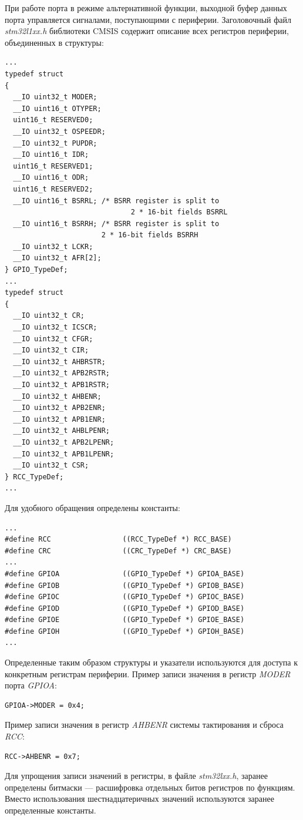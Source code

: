 При работе порта в режиме альтернативной функции, выходной буфер данных порта управляется сигналами, поступающими с периферии. Заголовочный файл \textit{stm32l1xx.h} библиотеки CMSIS содержит описание всех регистров периферии, объединенных в структуры:
\begin{verbatim}
...
typedef struct
{
  __IO uint32_t MODER;
  __IO uint16_t OTYPER;
  uint16_t RESERVED0;
  __IO uint32_t OSPEEDR;
  __IO uint32_t PUPDR;
  __IO uint16_t IDR;
  uint16_t RESERVED1;
  __IO uint16_t ODR;
  uint16_t RESERVED2;
  __IO uint16_t BSRRL; /* BSRR register is split to 
                    		  2 * 16-bit fields BSRRL 
  __IO uint16_t BSRRH; /* BSRR register is split to 
                       2 * 16-bit fields BSRRH 
  __IO uint32_t LCKR;
  __IO uint32_t AFR[2];
} GPIO_TypeDef;
...
typedef struct
{
  __IO uint32_t CR;
  __IO uint32_t ICSCR;
  __IO uint32_t CFGR;
  __IO uint32_t CIR;
  __IO uint32_t AHBRSTR;
  __IO uint32_t APB2RSTR;
  __IO uint32_t APB1RSTR;
  __IO uint32_t AHBENR;
  __IO uint32_t APB2ENR;
  __IO uint32_t APB1ENR;
  __IO uint32_t AHBLPENR;
  __IO uint32_t APB2LPENR;
  __IO uint32_t APB1LPENR;      
  __IO uint32_t CSR;    
} RCC_TypeDef;
...
\end{verbatim}
Для удобного обращения определены константы:
\begin{verbatim}
...
#define RCC                 ((RCC_TypeDef *) RCC_BASE)
#define CRC                 ((CRC_TypeDef *) CRC_BASE)
...
#define GPIOA               ((GPIO_TypeDef *) GPIOA_BASE)
#define GPIOB               ((GPIO_TypeDef *) GPIOB_BASE)
#define GPIOC               ((GPIO_TypeDef *) GPIOC_BASE)
#define GPIOD               ((GPIO_TypeDef *) GPIOD_BASE)
#define GPIOE               ((GPIO_TypeDef *) GPIOE_BASE)
#define GPIOH               ((GPIO_TypeDef *) GPIOH_BASE)
...

\end{verbatim}

Определенные таким образом структуры и указатели используются для доступа к конкретным регистрам периферии. Пример записи значения в регистр \textit{MODER} порта \textit{GPIOA}:
\begin{verbatim}
GPIOA->MODER = 0x4;
\end{verbatim}
Пример записи значения в регистр \textit{AHBENR }системы тактирования и сброса \textit{RCC}:

\begin{verbatim}
RCC->AHBENR = 0x7;
\end{verbatim}
Для упрощения записи значений в регистры, в файле \textit{stm32lxx.h}, заранее определены битмаски --- расшифровка отдельных битов регистров по функциям.  Вместо использования шестнадцатеричных значений используются заранее определенные константы.

